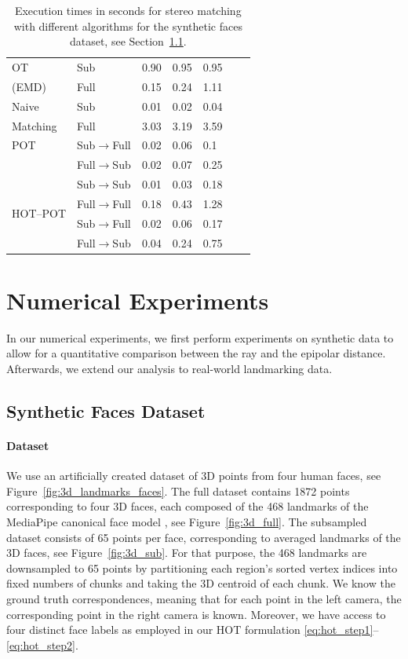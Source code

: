 \documentclass[10pt, twocolumn]{article}
\theoremstyle{definition}
\begin{document}
{\begin{table}[htb!]
\begin{tabular}{|l|l|l|l|l|l|l|}
OT& Sub        &  0.90  & 0.95 &  0.95 \\
(EMD) & Full       &  0.15   & 0.24  &  1.11  \\
\hline
Naive& Sub        &  0.01  & 0.02 & 0.04  \\
Matching& Full       &  3.03   & 3.19   &  3.59   \\
\hline
POT& Sub$\rightarrow$Full  & 0.02  &  0.06  & 0.1    \\
& Full$\rightarrow$Sub  & 0.02  &  0.07  & 0.25    \\
\hline
\multirow{4}{*}{HOT--POT} 
& Sub$\rightarrow$Sub   & 0.01  & 0.03 &   0.18 \\
& Full$\rightarrow$Full  &  0.18 & 0.43  &  1.28 \\
& Sub$\rightarrow$Full  &  0.02  & 0.06  &  0.17   \\
& Full$\rightarrow$Sub  &  0.04 &  0.24  &  0.75   \\
\hline
\end{tabular}
\caption{Execution times in seconds for stereo matching with different algorithms for the synthetic faces dataset, see Section~\ref{sec:Synth_Faces}.}
\label{tab:exec_time}
\end{table}
}

\section{Numerical Experiments} \label{sec:Numerical_Experiments}
In our numerical experiments, 
we first perform experiments on synthetic data to allow for a quantitative comparison between the ray and the epipolar distance. 
Afterwards, we extend our analysis to real-world landmarking data. 


\subsection{Synthetic Faces Dataset} \label{sec:Synth_Faces}

\paragraph*{Dataset} 
We use an artificially created dataset of 3D points from four human faces, see Figure~\ref{fig:3d_landmarks_faces}. 
The full dataset contains 1872 points corresponding to four 3D faces, each composed of the 468 landmarks of the MediaPipe canonical face model \cite{lugaresi2019mediapipe}, see Figure~\ref{fig:3d_full}.
The subsampled dataset consists of 65 points per face, {corresponding to 
averaged landmarks of the 3D faces}, see Figure~\ref{fig:3d_sub}. 
For that purpose, the 468 landmarks are downsampled to 65 points by partitioning each region's sorted vertex indices into fixed numbers of chunks and taking the 3D centroid of each chunk. 
We know the ground truth correspondences, meaning that for each point in the left camera, the corresponding point in the right camera is known.
Moreover, we have access to four distinct face labels as employed in our HOT formulation \eqref{eq:hot_step1}--\eqref{eq:hot_step2}.
\end{document}

